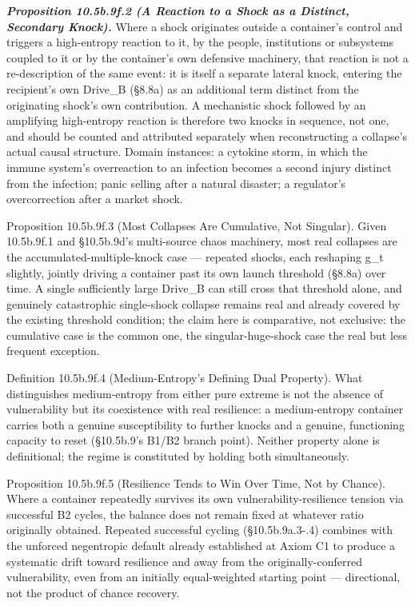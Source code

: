 \documentclass[
]{article}
\begin{document}
\emph{\textbf{Proposition 10.5b.9f.2 (A Reaction to a Shock as a
Distinct, Secondary Knock).}} Where a shock originates outside a
container's control and triggers a high-entropy reaction to it, by the
people, institutions or subsystems coupled to it or by the container's
own defensive machinery, that reaction is not a re-description of the
same event: it is itself a separate lateral knock, entering the
recipient's own Drive\_B (§8.8a) as an additional term distinct from the
originating shock's own contribution. A mechanistic shock followed by an
amplifying high-entropy reaction is therefore two knocks in sequence,
not one, and should be counted and attributed separately when
reconstructing a collapse's actual causal structure. Domain instances: a
cytokine storm, in which the immune system's overreaction to an
infection becomes a second injury distinct from the infection; panic
selling after a natural disaster; a regulator's overcorrection after a
market shock.

Proposition 10.5b.9f.3 (Most Collapses Are Cumulative, Not Singular).
Given 10.5b.9f.1 and §10.5b.9d's multi-source chaos machinery, most real
collapses are the accumulated-multiple-knock case --- repeated shocks,
each reshaping g\_t slightly, jointly driving a container past its own
launch threshold (§8.8a) over time. A single sufficiently large Drive\_B
can still cross that threshold alone, and genuinely catastrophic
single-shock collapse remains real and already covered by the existing
threshold condition; the claim here is comparative, not exclusive: the
cumulative case is the common one, the singular-huge-shock case the real
but less frequent exception.

Definition 10.5b.9f.4 (Medium-Entropy's Defining Dual Property). What
distinguishes medium-entropy from either pure extreme is not the absence
of vulnerability but its coexistence with real resilience: a
medium-entropy container carries both a genuine susceptibility to
further knocks and a genuine, functioning capacity to reset (§10.5b.9's
B1/B2 branch point). Neither property alone is definitional; the regime
is constituted by holding both simultaneously.

Proposition 10.5b.9f.5 (Resilience Tends to Win Over Time, Not by
Chance). Where a container repeatedly survives its own
vulnerability-resilience tension via successful B2 cycles, the balance
does not remain fixed at whatever ratio originally obtained. Repeated
successful cycling (§10.5b.9a.3-.4) combines with the unforced
negentropic default already established at Axiom C1 to produce a
systematic drift toward resilience and away from the
originally-conferred vulnerability, even from an initially
equal-weighted starting point --- directional, not the product of chance
recovery.
\end{document}
